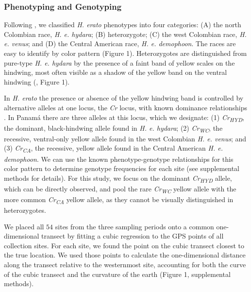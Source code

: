 \documentclass[]{article}
\begin{document}
\subsubsection{Phenotyping and
Genotyping}\label{phenotyping-and-genotyping}

Following \citet{Mallet:1986vj}, we classified \textit{H. erato}
phenotypes into four categories: (A) the north Colombian race,
\textit{H. e. hydara}; (B) heterozygote; (C) the west Colombian race,
\textit{H. e. venus}; and (D) the Central American race,
\textit{H. e. demophoon}. The races are easy to identify by color
pattern (Figure 1). Heterozygotes are distinguished from pure-type
\textit{H. e. hydara} by the presence of a faint band of yellow scales
on the hindwing, most often visible as a shadow of the yellow band on
the ventral hindwing (\citealp{Mallet:1986vj}, Figure 1).

In \textit{H. erato} the presence or absence of the yellow hindwing band
is controlled by alternative alleles at one locus, the \textit{Cr}
locus, with known dominance relationships
\citep{Sheppard:1985gu, Mallet:1986vj, Nadeau:2016gi, VanBelleghem:2017ff}.
In Panamá there are three alleles at this locus, which we designate: (1)
\textit{Cr\textsubscript{HYD}}, the dominant, black-hindwing allele
found in \textit{H. e. hydara}; (2) \textit{Cr\textsubscript{WC}}, the
recessive, ventral-only yellow allele found in the west Colombian
\textit{H. e. venus}; and (3) \textit{Cr\textsubscript{CA}}, the
recessive, yellow allele found in the Central American
\textit{H. e. demophoon}. We can use the known phenotype-genotype
relationships for this color pattern to determine genotype frequencies
for each site (see supplemental methods for details). For this study, we
focus on the dominant \textit{Cr\textsubscript{HYD}} allele, which can
be directly observed, and pool the rare \textit{Cr\textsubscript{WC}}
yellow allele with the more common \textit{Cr\textsubscript{CA}} yellow
allele, as they cannot be visually distinguished in heterozygotes.

We placed all \(54\) sites from the three sampling periods onto a common
one-dimensional transect by fitting a cubic regression to the GPS points
of all collection sites. For each site, we found the point on the cubic
transect closest to the true location. We used those points to calculate
the one-dimensional distance along the transect relative to the
westernmost site, accounting for both the curve of the cubic transect
and the curvature of the earth (Figure 1, supplemental methods).
\end{document}
